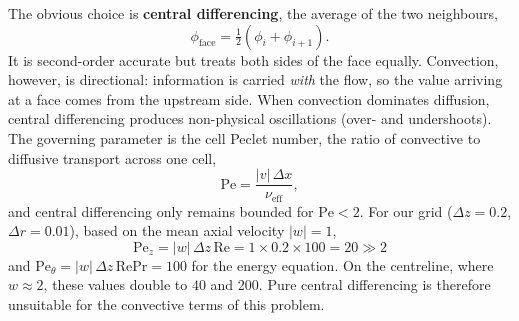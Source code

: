 \documentclass[12pt,a4paper]{article}
\newcommand{\Rey}{\text{Re}}
\newcommand{\Pran}{\text{Pr}}
\begin{document}
The obvious choice is \textbf{central differencing}, the average of the two neighbours,
\begin{equation}
    \phi_{\text{face}} = \tfrac12\left(\phi_i + \phi_{i+1}\right).
\end{equation}
It is second-order accurate but treats both sides of the face equally. Convection, however, is
directional: information is carried \emph{with} the flow, so the value arriving at a face comes
from the upstream side. When convection dominates diffusion, central differencing produces
non-physical oscillations (over- and undershoots). The governing parameter is the cell Peclet
number, the ratio of convective to diffusive transport across one cell,
\begin{equation}
    \text{Pe} = \frac{|v|\,\Delta x}{\nu_{\text{eff}}},
\end{equation}
and central differencing only remains bounded for $\text{Pe} < 2$. For our grid
($\Delta z = 0.2$, $\Delta r = 0.01$), based on the mean axial velocity $|w|=1$,
\begin{equation}
    \text{Pe}_z = |w|\,\Delta z\,\Rey = 1 \times 0.2 \times 100 = 20 \gg 2
\end{equation}
and $\text{Pe}_\theta = |w|\,\Delta z\,\Rey\Pran = 100$ for the energy equation. On the
centreline, where $w\approx2$, these values double to $40$ and $200$. Pure central differencing
is therefore unsuitable for the convective terms of this problem.
\end{document}

